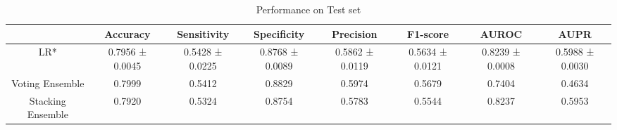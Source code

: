 \begin{table}[h!]
    \centering
    \caption{Performance on Test set}
    \begin{adjustbox}{width=\textwidth}
    \begin{tabular}{|c|c|c|c|c|c|c|c|}
    \hline
      & Accuracy & Sensitivity & Specificity & Precision & F1-score & AUROC & AUPR \\
    \hline
    LR* & 0.7956 ± 0.0045 & 0.5428 ± 0.0225 & 0.8768 ± 0.0089 & 0.5862 ± 0.0119 & 0.5634 ± 0.0121 & 0.8239 ± 0.0008 & 0.5988 ± 0.0030 \\
    \hline
    Voting Ensemble & 0.7999 & 0.5412 & 0.8829 & 0.5974 & 0.5679 & 0.7404 & 0.4634 \\
    \hline
    Stacking Ensemble & 0.7920 & 0.5324 & 0.8754 & 0.5783 & 0.5544 & 0.8237 & 0.5953 \\
    \hline
    \end{tabular}
    \end{adjustbox}
    \end{table}
    